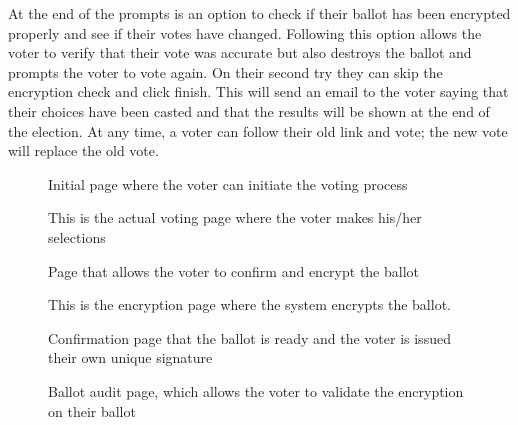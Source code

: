 At the end of the prompts is an option to check if their ballot has
been encrypted properly and see if their votes have changed. Following
this option allows the voter to verify that their vote was accurate
but also destroys the ballot and prompts the voter to vote again. On
their second try they can skip the encryption check and click
finish. This will send an email to the voter saying that their choices
have been casted and that the results will be shown at the end of the
election. At any time, a voter can follow their old link and vote; the
new vote will replace the old vote.

\begin{figure}
  \centering {}
  \caption{Initial page where the voter can initiate the voting
    process}
  \label{fig:helios-initial}
\end{figure}

\begin{figure}
  \centering {}
  \caption{This is the actual voting page where the voter makes
    his/her selections}
  \label{fig:helios-voting}
\end{figure}

\begin{figure}
  \centering {}
  \caption{Page that allows the voter to confirm and encrypt the
    ballot}
  \label{fig:helios-confirm}
\end{figure}

\begin{figure}
  \centering {}
  \caption{This is the encryption page where the system encrypts the
    ballot.}
  \label{fig:helios-encrypt}
\end{figure}

\begin{figure}
  \centering {}
  \caption{Confirmation page that the ballot is ready and the voter is
    issued their own unique signature}
  \label{fig:helios-signature}
\end{figure}

\begin{figure}
  \centering {}
  \caption{Ballot audit page, which allows the voter to validate the
    encryption on their ballot}
  \label{fig:helios-audit}
\end{figure}

